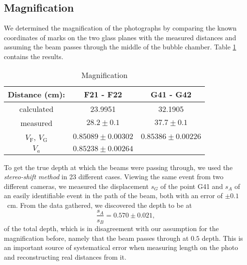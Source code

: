 \documentclass[twocolumn]{article}
\begin{document}
\subsection{Magnification}
We determined the magnification of the photographs by comparing the known coordinates of marks on the two glass planes with the measured distances and assuming the beam passes through the middle of the bubble chamber.\cite{seul} Table \ref{tab:magnification} contains the results.
\begin{table} [!h]
\centering
\begin{tabular}{|c|c|c|}
\hline
Distance (cm):	&	F21	- F22	&	G41	- G42\\\hline
calculated	&	23.9951		&  32.1905\\\hline
measured	&	$28.2 \pm 0.1$		&  $37.7 \pm 0.1$	\\\hline
$V_{\text{F}}$, $V_{\text{G}}$	& $0.85089 \pm 0.00302$	& $0.85386 \pm 0.00226$\\\cline{1-3}
$V_{a}$	& $0.85238 \pm 	0.00264$ \\
\cline{1-2}
\end{tabular}
\caption{Magnification}
\label{tab:magnification}
\end{table}
\par To get the true depth at which the beams were passing through, we used the \textit{stereo-shift method} in 23 different cases. Viewing the same event from two different cameras, we measured the displacement $s_G$ of the point G41 and $s_A$ of an easily identifiable event in the path of the beam, both with an error of $\pm 0.1$~cm. From the data gathered, we discovered the depth to be at
\begin{equation}
\frac{s_A}{s_B} = 0.570 \pm 0.021,
\end{equation}
of the total depth, which is in disagreement with our assumption for the magnification before, namely that the beam passes through at $0.5$ depth. This is an important source of systematical error when measuring length on the photo and reconstructing real distances from it.
\end{document}
